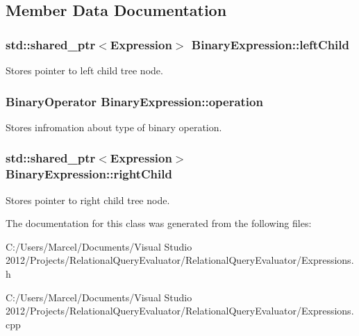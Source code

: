 \subsection{Member Data Documentation}
\hypertarget{class_binary_expression_a2388939b40f93649cfd3c531b181025e}{
\subsubsection[{left\+Child}]{\setlength{\rightskip}{0pt plus 5cm}std\+::shared\+\_\+ptr$<${\bf Expression}$>$ Binary\+Expression\+::left\+Child}}\label{class_binary_expression_a2388939b40f93649cfd3c531b181025e}
Stores pointer to left child tree node. \hypertarget{class_binary_expression_ac3926bbcc2ed7bb00eca10b4d4e590d2}{
\subsubsection[{operation}]{\setlength{\rightskip}{0pt plus 5cm}Binary\+Operator Binary\+Expression\+::operation}}\label{class_binary_expression_ac3926bbcc2ed7bb00eca10b4d4e590d2}
Stores infromation about type of binary operation. \hypertarget{class_binary_expression_a97803d6333b2fbe6098491136a1445af}{
\subsubsection[{right\+Child}]{\setlength{\rightskip}{0pt plus 5cm}std\+::shared\+\_\+ptr$<${\bf Expression}$>$ Binary\+Expression\+::right\+Child}}\label{class_binary_expression_a97803d6333b2fbe6098491136a1445af}
Stores pointer to right child tree node. 

The documentation for this class was generated from the following files\+:\begin{DoxyCompactItemize}
\item 
C\+:/\+Users/\+Marcel/\+Documents/\+Visual Studio 2012/\+Projects/\+Relational\+Query\+Evaluator/\+Relational\+Query\+Evaluator/Expressions.\+h\item 
C\+:/\+Users/\+Marcel/\+Documents/\+Visual Studio 2012/\+Projects/\+Relational\+Query\+Evaluator/\+Relational\+Query\+Evaluator/Expressions.\+cpp\end{DoxyCompactItemize}
